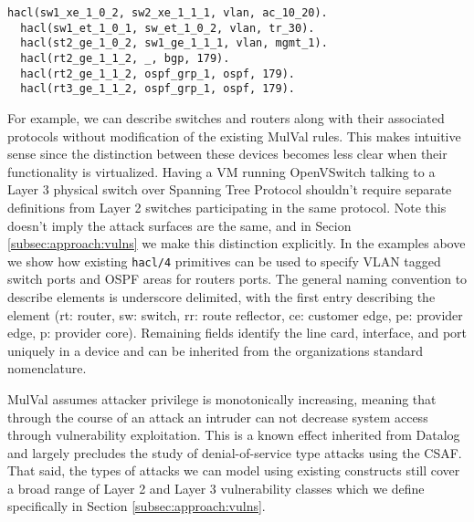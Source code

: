 \begin{Verbatim}[fontsize=\small, breaklines]
  hacl(sw1_xe_1_0_2, sw2_xe_1_1_1, vlan, ac_10_20).   
  hacl(sw1_et_1_0_1, sw_et_1_0_2, vlan, tr_30). 
  hacl(st2_ge_1_0_2, sw1_ge_1_1_1, vlan, mgmt_1). 
  hacl(rt2_ge_1_1_2, _, bgp, 179). 
  hacl(rt2_ge_1_1_2, ospf_grp_1, ospf, 179).
  hacl(rt3_ge_1_1_2, ospf_grp_1, ospf, 179).
\end{Verbatim}




For example, we can describe switches and routers along with their associated protocols without modification of the existing MulVal rules. This makes intuitive sense since the distinction between these devices becomes less clear when their functionality is virtualized. Having a VM running OpenVSwitch talking to a Layer 3 physical switch over Spanning Tree Protocol shouldn't require separate definitions from Layer 2 switches participating in the same protocol. Note this doesn't imply the attack surfaces are the same, and in Secion \ref{subsec:approach:vulns} we make this distinction explicitly. In the examples above we show how existing \verb|hacl/4| primitives can be used to specify VLAN tagged switch ports and OSPF areas for routers ports. The general naming convention to describe elements is underscore delimited, with the first entry describing the element (rt: router, sw: switch, rr: route reflector, ce: customer edge, pe: provider edge, p: provider core). Remaining fields identify the line card, interface, and port uniquely in a device and can be inherited from the organizations standard nomenclature. 

MulVal assumes attacker privilege is monotonically increasing, meaning that through the course of an attack an intruder can not decrease system access through vulnerability exploitation. This is a known\cite[Ch 2.6]{Ou_Appel_2005} effect inherited from Datalog and largely precludes the study of denial-of-service type attacks using the CSAF. That said, the types of attacks we can model using existing constructs still cover a broad range of Layer 2 and Layer 3 vulnerability classes which we define specifically in Section \ref{subsec:approach:vulns}.  



